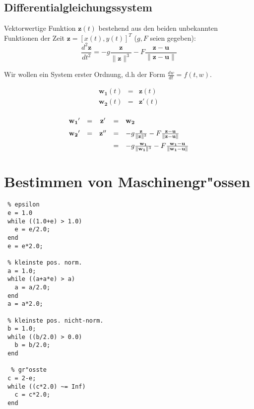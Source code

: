 \documentclass[german, 10pt, a4paper, twocolumn]{scrartcl}
\theoremstyle{definition}
\begin{document}
\normalsize

\subsection{Differentialgleichungssystem}

Vektorwertige Funktion $\mathbf{z}(t)$ bestehend aus den beiden unbekannten Funktionen der Zeit $\mathbf{z}=[x(t),y(t)]^T$ ($g,F$ seien gegeben):
\begin{displaymath}
	\frac{d^2\mathbf{z}}{dt^2} = -g \frac{\mathbf{z}}{\parallel \mathbf{z} \parallel ^{3}} - F \frac{\mathbf{z}-\mathbf{u}}{\parallel \mathbf{z} -\mathbf{u} \parallel}
\end{displaymath}

Wir wollen ein System erster Ordnung, d.h der Form $\frac{dw}{dt}= f(t,w)$.

\begin{eqnarray*}
	\mathbf{w_1}(t) &	= &	\mathbf{z}(t)\\
	\mathbf{w_2}(t) &	= &	\mathbf{z}'(t)
\end{eqnarray*}

\begin{displaymath}
	\renewcommand{\arraystretch}{1.5}
	\begin{array}{rcccl}
	\mathbf{w_1}' &		= &	\mathbf{z}' &	= &	\mathbf{w_2}\\
	\mathbf{w_2}' &		= &	\mathbf{z}'' &	= &	- g \frac{\mathbf{z}}{\parallel \mathbf{z} \parallel^3} - F \frac{\mathbf{z}-\mathbf{u}}{\parallel \mathbf{z} - \mathbf{u} \parallel}\\
	&			&	&		= &	- g \frac{\mathbf{w_1}}{\parallel \mathbf{w_1} \parallel^3} - F \frac{\mathbf{w_1}-\mathbf{u}}{\parallel \mathbf{w_1} - \mathbf{u} \parallel}
	\end{array}
	\renewcommand{\arraystretch}{1}
\end{displaymath}

\section{Bestimmen von Maschinengr"ossen}

\small
\begin{verbatim}
 % epsilon
 e = 1.0
 while ((1.0+e) > 1.0)
   e = e/2.0;
 end
 e = e*2.0;

 % kleinste pos. norm.
 a = 1.0;
 while ((a+a*e) > a)
   a = a/2.0;
 end
 a = a*2.0;

 % kleinste pos. nicht-norm.
 b = 1.0;
 while ((b/2.0) > 0.0)
   b = b/2.0;
 end

  % gr"osste
 c = 2-e;
 while ((c*2.0) ~= Inf)
   c = c*2.0;
 end
\end{verbatim}
\normalsize
\end{document}
